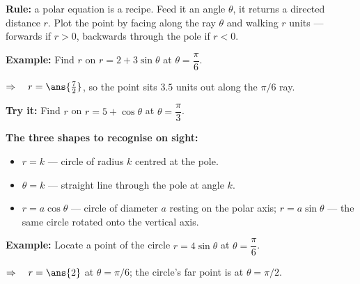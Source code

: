 \documentclass[12pt]{article}
\begin{document}


\begin{formulabox}
\textbf{Rule:} a polar equation is a recipe. Feed it an angle $\theta$, it returns a
directed distance $r$. Plot the point by facing along the ray $\theta$ and walking
$r$ units --- forwards if $r > 0$, backwards through the pole if $r < 0$.
\end{formulabox}

\begin{examplebox}
\textbf{Example:} \quad Find $r$ on $r = 2 + 3\sin\theta$ at $\theta = \dfrac{\pi}{6}$.

$\Rightarrow\quad r = \ans{\tfrac{7}{2}}$, so the point sits $3.5$ units out along the $\pi/6$ ray.
\end{examplebox}

\begin{tryitbox}
\textbf{Try it:} \quad Find $r$ on $r = 5 + \cos\theta$ at $\theta = \dfrac{\pi}{3}$.\\[2pt]
\end{tryitbox}


\begin{formulabox}
\textbf{The three shapes to recognise on sight:}
\begin{itemize}[leftmargin=0.9cm, itemsep=0pt, topsep=1pt]
  \item $r = k$ --- circle of radius $k$ centred at the pole.
  \item $\theta = k$ --- straight line through the pole at angle $k$.
  \item $r = a\cos\theta$ --- circle of diameter $a$ resting on the polar axis;
        $r = a\sin\theta$ --- the same circle rotated onto the vertical axis.
\end{itemize}
\end{formulabox}

\begin{examplebox}
\textbf{Example:} \quad Locate a point of the circle $r = 4\sin\theta$ at $\theta = \dfrac{\pi}{6}$.

$\Rightarrow\quad r = \ans{2}$ at $\theta = \pi/6$; the circle's far point is at $\theta = \pi/2$.
\end{examplebox}
\end{document}
